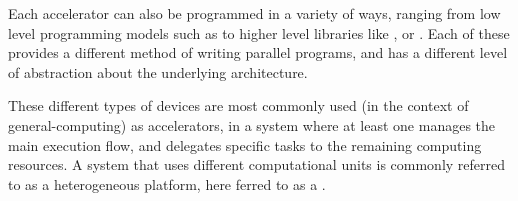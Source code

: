 \documentclass[main.tex]{subfiles}
\begin{document}
Each accelerator can also be programmed in a variety of ways, ranging from low level programming models such as \cuda to higher level libraries like \openmp, or \openacc. Each of these provides a different method of writing parallel programs, and has a different level of abstraction about the underlying architecture.

These different types of devices are most commonly used (in the context of general-computing) as accelerators, in a system where at least one \cpu manages the main execution flow, and delegates specific tasks to the remaining computing resources. A system that uses different computational units is commonly referred to as a heterogeneous platform, here ferred to as a \hetplat.
\end{document}
